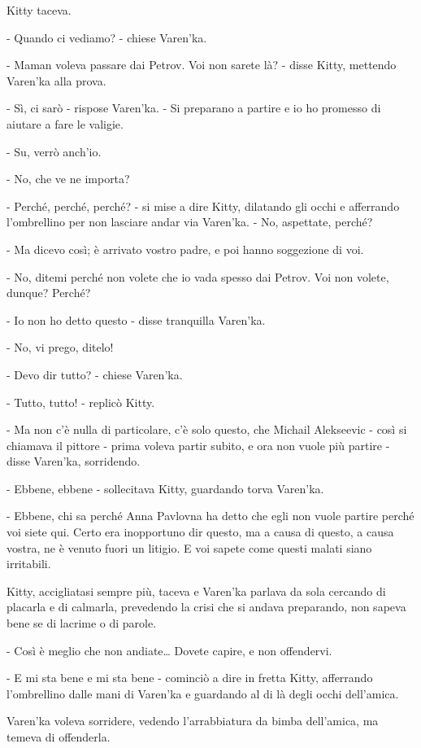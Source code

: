 Kitty taceva. 

- Quando ci vediamo? - chiese Varen'ka. 

- Maman voleva passare dai Petrov. Voi non sarete là? - disse Kitty, mettendo Varen'ka alla prova. 

- Sì, ci sarò - rispose Varen'ka. - Si preparano a partire e io ho promesso di aiutare a fare le valigie. 

- Su, verrò anch'io. 

- No, che ve ne importa? 

- Perché, perché, perché? - si mise a dire Kitty, dilatando gli occhi e afferrando l'ombrellino per non lasciare andar via Varen'ka. - No, aspettate, perché? 

- Ma dicevo così; è arrivato vostro padre, e poi hanno soggezione di voi. 

- No, ditemi perché non volete che io vada spesso dai Petrov. Voi non volete, dunque? Perché? 

- Io non ho detto questo - disse tranquilla Varen'ka. 

- No, vi prego, ditelo! 

- Devo dir tutto? - chiese Varen'ka. 

- Tutto, tutto! - replicò Kitty. 

- Ma non c'è nulla di particolare, c'è solo questo, che Michail Alekseevic - così si chiamava il pittore - prima voleva partir subito, e ora non vuole più partire - disse Varen'ka, sorridendo. 

- Ebbene, ebbene - sollecitava Kitty, guardando torva Varen'ka. 

- Ebbene, chi sa perché Anna Pavlovna ha detto che egli non vuole partire perché voi siete qui. Certo era inopportuno dir questo, ma a causa di questo, a causa vostra, ne è venuto fuori un litigio. E voi sapete come questi malati siano irritabili. 

Kitty, accigliatasi sempre più, taceva e Varen'ka parlava da sola cercando di placarla e di calmarla, prevedendo la crisi che si andava preparando, non sapeva bene se di lacrime o di parole. 

- Così è meglio che non andiate\ldots{} Dovete capire, e non offendervi. 

- E mi sta bene e mi sta bene - cominciò a dire in fretta Kitty, afferrando l'ombrellino dalle mani di Varen'ka e guardando al di là degli occhi dell'amica. 

Varen'ka voleva sorridere, vedendo l'arrabbiatura da bimba dell'amica, ma temeva di offenderla. 

